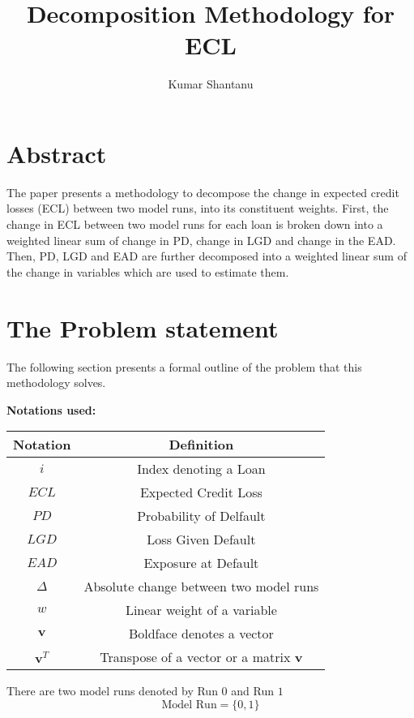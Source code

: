 \documentclass{article}
\title{Decomposition Methodology for ECL}
\author{Kumar Shantanu}
\numberwithin{equation}{section}
\begin{document}
\maketitle

\section{Abstract}
The paper presents a methodology to decompose the change in expected credit losses (ECL) between two model runs, into its constituent weights. First, the change in ECL between two model runs for each loan is broken down into a weighted linear sum of change in PD, change in LGD and change in the EAD. Then, PD, LGD and EAD are further decomposed into a weighted linear sum of the change in variables which are used to estimate them.  

\section{The Problem statement}
The following section presents a formal outline of the problem that this methodology solves.

\textbf{Notations used: }

\begin{table}[h]
  \centering
  \label{tab:notations}
  \begin{tabular}{cc}
  \hline
  \textbf{Notation} & \textbf{Definition}  \\
  \hline
  $i$ & Index denoting a Loan  \\
  $ECL$ & Expected Credit Loss  \\
  $PD$ & Probability of Delfault  \\
  $LGD$ & Loss Given Default \\
  $EAD$ & Exposure at Default \\
  $\Delta$ & Absolute change between two model runs\\
  $w$ & Linear weight of a variable \\
  $\mathbf{v}$ & Boldface denotes a vector \\
  $\mathbf{v}^T$ & Transpose of a vector or a matrix $\mathbf{v}$ \\

  \hline
  \end{tabular}
  \end{table}
  

There are two model runs denoted by Run $0$ and Run $1$
\begin{equation} \text{Model Run} = \{0,1\} \end{equation}
\end{document}
